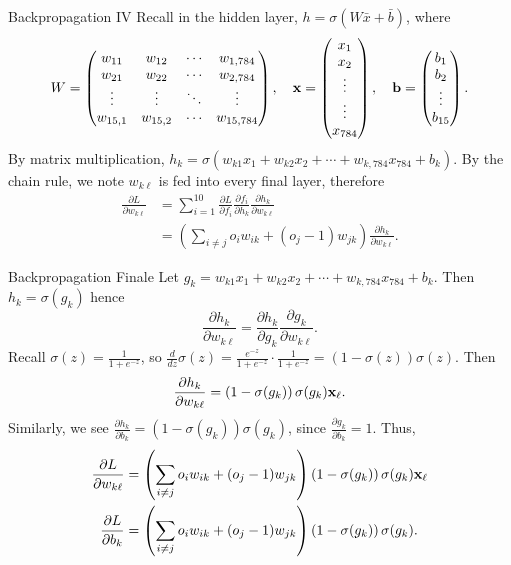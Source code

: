 \documentclass[xcolor=dvipsnames, fontsize=11pt, %
pagesize, %
parskip=half-, t]{beamer}
\begin{document}
\begin{frame}{Backpropagation IV}
Recall in the hidden layer, $h=\sigma(W\bar{x}+\bar{b})$, where  $$W=\begin{pmatrix} w_{11} & w_{12}  & \cdots &  w_{1,784} \\  w_{21} & w_{22} & \cdots & w_{2,784} \\  \vdots & \vdots  & \ddots & \vdots \\  w_{15, 1} & w_{15, 2}  & \cdots & w_{15, 784} \end{pmatrix}, \quad \bold{x}=\begin{pmatrix} x_1 \\ x_2 \\ \vdots  \\ \vdots \\ x_{784} \end{pmatrix}, \quad \bold{b}=\begin{pmatrix} b_1 \\ b_2 \\ \vdots \\ b_{15} \end{pmatrix}.$$ \pause
By matrix multiplication, $h_k=\sigma(w_{k1}x_1+w_{k2}x_2+\cdots+w_{k,784}x_{784}+b_k)$. \pause By the chain rule, we note $w_{k\ell}$ is fed into every final layer, therefore \begin{align*} \frac{\partial L}{\partial w_{k\ell}}&=\sum_{i=1}^{10}\frac{\partial L}{\partial f_i}\frac{\partial f_i}{\partial h_k}\frac{\partial h_k}{\partial w_{k\ell}} \\ &= \left(\sum_{i\neq j}o_iw_{ik}+(o_j-1)w_{jk}\right)\frac{\partial h_k}{\partial w_{k\ell}}.\end{align*}
\end{frame}
\begin{frame}{Backpropagation Finale}
Let $g_k=w_{k1}x_1+w_{k2}x_2+\cdots+w_{k,784}x_{784}+b_k$. Then $h_k=\sigma(g_k)$ hence $$\frac{\partial h_k}{\partial w_{k\ell}}=\frac{\partial h_k}{\partial g_k}\frac{\partial g_k}{\partial w_{k\ell}}.$$ \pause
Recall $\sigma(z)=\frac{1}{1+e^{-z}}$, so $\frac{d}{dz}\sigma(z)=\frac{e^{-z}}{1+e^{-z}}\cdot \frac{1}{1+e^{-z}}=\left(1-\sigma(z)\right)\sigma(z).$ \pause Then $$\frac{\partial h_k}{\partial w_{k\ell}}=\left(1-\sigma(g_k)\right)\sigma(g_k)\bold{x}_{\ell}.$$ \pause Similarly, we see $\frac{\partial h_k}{\partial b_k}=\left(1-\sigma(g_k)\right)\sigma(g_k)$, since $\frac{\partial g_k}{\partial b_k}=1$. \pause Thus, \begin{align*} \frac{\partial L}{\partial w_{k\ell}}&=\left(\sum_{i\neq j}o_iw_{ik}+(o_j-1)w_{jk}\right)\left(1-\sigma(g_k)\right)\sigma(g_k)\bold{x}_{\ell} \\ \frac{\partial L}{\partial b_k}&=\left(\sum_{i\neq j}o_iw_{ik}+(o_j-1)w_{jk}\right)\left(1-\sigma(g_k)\right)\sigma(g_k). \end{align*}
\end{frame}
\end{document}
